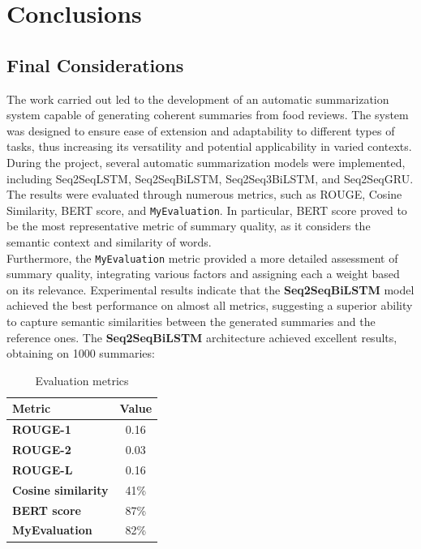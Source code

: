 \section{Conclusions}
\subsection{Final Considerations}
The work carried out led to the development of an automatic summarization system capable of generating coherent summaries from food reviews. The system was designed to ensure ease of extension and adaptability to different types of tasks, thus increasing its versatility and potential applicability in varied contexts.\\
During the project, several automatic summarization models were implemented, including Seq2SeqLSTM, Seq2SeqBiLSTM, Seq2Seq3BiLSTM, and Seq2SeqGRU.
The results were evaluated through numerous metrics, such as ROUGE, Cosine Similarity, BERT score, and \texttt{MyEvaluation}. In particular,
BERT score proved to be the most representative metric of summary quality, as it considers the semantic context and similarity of words.\\

Furthermore, the \texttt{MyEvaluation} metric provided a more detailed assessment of summary quality, integrating various factors and assigning each a weight based on its relevance. Experimental results indicate that the \textbf{Seq2SeqBiLSTM} model achieved the best performance on almost all metrics,
suggesting a superior ability to capture semantic similarities between the generated summaries and the reference ones.
The \textbf{Seq2SeqBiLSTM} architecture achieved excellent results, obtaining on 1000 summaries:
\begin{table}[ht]
    \centering
    \begin{tabular}{@{} >{\bfseries}l c @{}}
        \toprule
        \textbf{Metric}    & \textbf{Value} \\
        \midrule
        ROUGE-1             & 0.16            \\
        ROUGE-2             & 0.03            \\
        ROUGE-L             & 0.16            \\
        Cosine similarity   & 41\%            \\
        BERT score           & 87\%            \\
        MyEvaluation        & 82\%            \\
        \bottomrule
    \end{tabular}
    \caption{Evaluation metrics}
\end{table}

